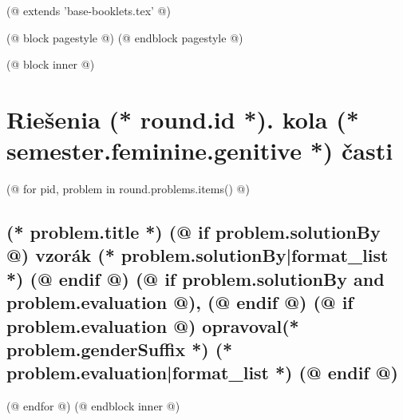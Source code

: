 (@ extends 'base-booklets.tex' @)
 
(@ block pagestyle @)
    \pagestyle{seminar-(* competition.id *)-(* volume.id *)-(* semester.id *)-(* round.id *)-solutions}
(@ endblock pagestyle @)

(@ block inner @)
    \section{\texorpdfstring{Riešenia (* round.id *). kola (* semester.feminine.genitive *) časti}{Riešenia}}
        
    (@ for pid, problem in round.problems.items() @)%
        \setcounter{volume}{(* volume.number *)}%
        \setcounter{semester}{(* semester.number *)}%
        \setcounter{round}{(* round.number *)}%
        \setcounter{problem}{(* problem.number *)}%

        \subsection{%
            \texorpdfstring{%
                \large \textbf{(* problem.title *)} \hfill \normalsize%
                (@ if problem.solutionBy @)%
                    vzorák (* problem.solutionBy|format_list *)%
                (@ endif @)%
                (@ if problem.solutionBy and problem.evaluation @), (@ endif @)%
                (@ if problem.evaluation @)%
                    opravoval(* problem.genderSuffix *) (* problem.evaluation|format_list *)%
                (@ endif @)%
            }{(* round.number *).(* problem.number *) (* problem.title *)}%
        }

    (@ endfor @)
(@ endblock inner @)

